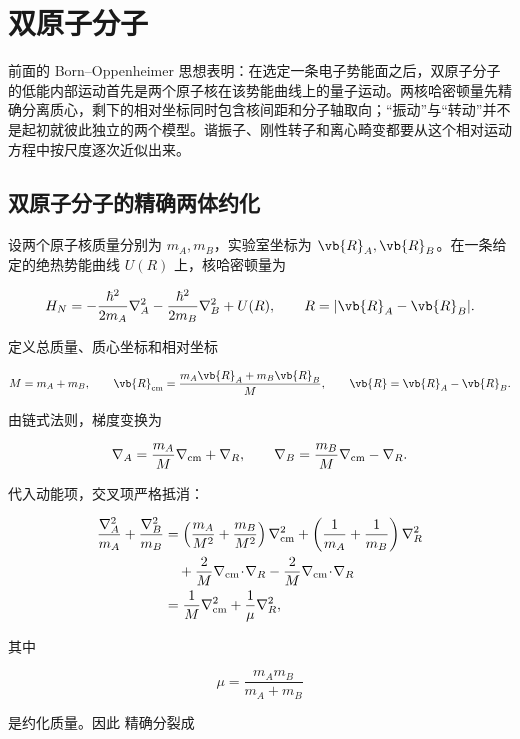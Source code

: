 \section{双原子分子}
\label{ch:diatomic-vib-rot}

前面的 Born--Oppenheimer 思想表明：在选定一条电子势能面之后，双原子分子的低能内部运动首先是两个原子核在该势能曲线上的量子运动。两核哈密顿量先精确分离质心，剩下的相对坐标同时包含核间距和分子轴取向；“振动”与“转动”并不是起初就彼此独立的两个模型。谐振子、刚性转子和离心畸变都要从这个相对运动方程中按尺度逐次近似出来。

\subsection{双原子分子的精确两体约化}
设两个原子核质量分别为 \(m_A,m_B\)，实验室坐标为 \(\vb{R}_A,\vb{R}_B\)。在一条给定的绝热势能曲线 \(U(R)\) 上，核哈密顿量为

\begin{equation}
H_N
=-\frac{\hbar^2}{2m_A}\nabla_A^2
-\frac{\hbar^2}{2m_B}\nabla_B^2
+U(R),
\qquad
R=|\vb{R}_A-\vb{R}_B|.
\label{eq:diatomic-nuclear-hamiltonian}
\end{equation}

定义总质量、质心坐标和相对坐标

\[
M=m_A+m_B,
\qquad
\vb{R}_{\rm cm}
=\frac{m_A\vb{R}_A+m_B\vb{R}_B}{M},
\qquad
\vb{R}=\vb{R}_A-\vb{R}_B.
\]

由链式法则，梯度变换为

\[
\nabla_A
=\frac{m_A}{M}\nabla_{\rm cm}+\nabla_R,
\qquad
\nabla_B
=\frac{m_B}{M}\nabla_{\rm cm}-\nabla_R.
\]

代入动能项，交叉项严格抵消：

\begin{align*}
\frac{\nabla_A^2}{m_A}+\frac{\nabla_B^2}{m_B}
&=\left(\frac{m_A}{M^2}+\frac{m_B}{M^2}\right)\nabla_{\rm cm}^2
+\left(\frac1{m_A}+\frac1{m_B}\right)\nabla_R^2\\
&\quad
+\frac{2}{M}\nabla_{\rm cm}\!\cdot\!\nabla_R
-\frac{2}{M}\nabla_{\rm cm}\!\cdot\!\nabla_R\\
&=\frac1M\nabla_{\rm cm}^2+\frac1\mu\nabla_R^2,
\end{align*}

其中

\begin{equation}
\mu=\frac{m_Am_B}{m_A+m_B}
\label{eq:diatomic-reduced-mass}
\end{equation}

是约化质量。因此  精确分裂成

